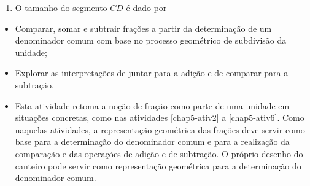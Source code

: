 \begin{multicols}{2}
\begin{solucao}{}{}
\begin{enumerate} [\quad a)]
  Se escrevermos as frações     $C$     e     $D $     com outro denominador comum pode ser mais fácil de observar mais que 6 frações. Por exemplo,     $C=\frac{30}{24}$     e     $D=\frac{44}{24}$     as frações a seguir estão entre     $C$     e     $D$ $$\frac{31}{24}, \frac{32}{24}, \frac{33}{24}, \frac{34}{24}, \frac{35}{24}, \frac{36}{24}, \frac{37}{24},$$
  $$\frac{38}{24}, \frac{39}{24}, \frac{40}{24}, \frac{41}{24}, \frac{42}{24}\; {\rm e }\; \frac{43}{24}.$$
  Note que conseguimos agora 13 frações entre     $C$     e     $D$. No entanto, se escrevermos     $C$     e     $D$     com o denominador 48 ainda podemos determinar mais valores. Note também que sempre podemos escolher um denominador maior de modo que encontremos mais valores.
  \item     O tamanho do segmento     $CD$     é dado por
\end{enumerate} %
\end{solucao}




\begin{objetivos}[label=chap5-ativ13]{}{}


  \begin{itemize} %
    \item       Comparar, somar e subtrair frações a partir da determinação de um denominador comum com base no processo geométrico de subdivisão da unidade;
    \item       Explorar as interpretações de juntar para a adição e de comparar para a subtração.
\end{itemize} %

\end{objetivos}

\begin{orientacoes}{}{}

  \begin{itemize} %
    \item       Esta atividade retoma a noção de fração como parte de uma unidade em situações concretas, como nas atividades \ref{chap5-ativ2} a \ref{chap5-ativ6}. Como naquelas atividades, a representação geométrica das frações deve servir como base para a determinação do denominador comum e para a realização da comparação e das operações de adição e de subtração. O próprio desenho do canteiro pode servir como representação geométrica para a determinação do denominador comum.
\end{itemize} %
\end{orientacoes}



\end{multicols}
